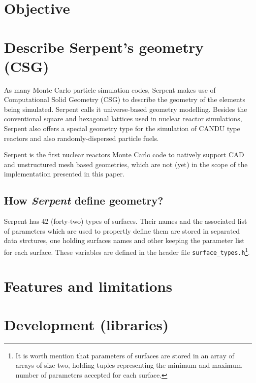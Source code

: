 \documentclass{elsarticle}
\begin{document}
\section{Objective}


\section{Describe Serpent's geometry (CSG)}

As many Monte Carlo particle simulation codes, Serpent makes use of Computational Solid Geometry (CSG) to
describe the geometry of the elements being simulated. Serpent calls it universe-based geometry modelling.
Besides the conventional square and hexagonal lattices used in nuclear reactor simulations, Serpent also
offers a special geometry type for the simulation of CANDU type reactors and also randomly-dispersed
particle fuels.

Serpent is the first nuclear reactors Monte Carlo code to natively support CAD and unstructured
mesh based geometries\cite{serpent-openfoam-mesh}, which are not (yet) in the scope of the implementation presented in this paper.

\subsection{How \textit{Serpent} define geometry?}

Serpent has 42 (forty-two) types of surfaces. Their names and the associated
list of parameters which are used to propertly define them are stored
in separated data strctures, one holding surfaces names and other keeping
the parameter list for each surface. These variables are defined in the
header file \texttt{surface\_types.h}\footnote{It is worth mention
  that parameters of surfaces are stored in an array of arrays of size
  two, holding tuples representing the minimum and maximum number of parameters
  accepted for each surface.}.


\section{Features and limitations}

\section{Development (libraries)}
\end{document}
